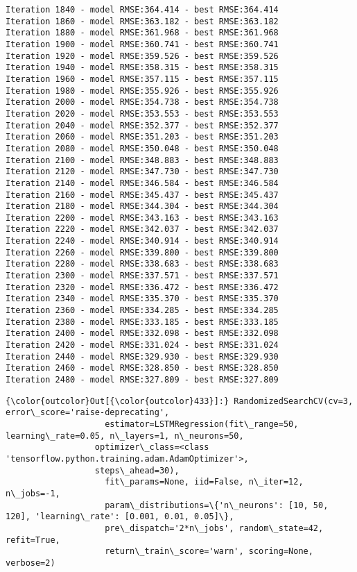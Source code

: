 \documentclass[11pt]{article}
\begin{document}
\begin{Verbatim}[commandchars=\\\{\},fontsize=\small]
Iteration 1840 - model RMSE:364.414 - best RMSE:364.414
Iteration 1860 - model RMSE:363.182 - best RMSE:363.182
Iteration 1880 - model RMSE:361.968 - best RMSE:361.968
Iteration 1900 - model RMSE:360.741 - best RMSE:360.741
Iteration 1920 - model RMSE:359.526 - best RMSE:359.526
Iteration 1940 - model RMSE:358.315 - best RMSE:358.315
Iteration 1960 - model RMSE:357.115 - best RMSE:357.115
Iteration 1980 - model RMSE:355.926 - best RMSE:355.926
Iteration 2000 - model RMSE:354.738 - best RMSE:354.738
Iteration 2020 - model RMSE:353.553 - best RMSE:353.553
Iteration 2040 - model RMSE:352.377 - best RMSE:352.377
Iteration 2060 - model RMSE:351.203 - best RMSE:351.203
Iteration 2080 - model RMSE:350.048 - best RMSE:350.048
Iteration 2100 - model RMSE:348.883 - best RMSE:348.883
Iteration 2120 - model RMSE:347.730 - best RMSE:347.730
Iteration 2140 - model RMSE:346.584 - best RMSE:346.584
Iteration 2160 - model RMSE:345.437 - best RMSE:345.437
Iteration 2180 - model RMSE:344.304 - best RMSE:344.304
Iteration 2200 - model RMSE:343.163 - best RMSE:343.163
Iteration 2220 - model RMSE:342.037 - best RMSE:342.037
Iteration 2240 - model RMSE:340.914 - best RMSE:340.914
Iteration 2260 - model RMSE:339.800 - best RMSE:339.800
Iteration 2280 - model RMSE:338.683 - best RMSE:338.683
Iteration 2300 - model RMSE:337.571 - best RMSE:337.571
Iteration 2320 - model RMSE:336.472 - best RMSE:336.472
Iteration 2340 - model RMSE:335.370 - best RMSE:335.370
Iteration 2360 - model RMSE:334.285 - best RMSE:334.285
Iteration 2380 - model RMSE:333.185 - best RMSE:333.185
Iteration 2400 - model RMSE:332.098 - best RMSE:332.098
Iteration 2420 - model RMSE:331.024 - best RMSE:331.024
Iteration 2440 - model RMSE:329.930 - best RMSE:329.930
Iteration 2460 - model RMSE:328.850 - best RMSE:328.850
Iteration 2480 - model RMSE:327.809 - best RMSE:327.809
    \end{Verbatim}
\begin{Verbatim}[commandchars=\\\{\}]
{\color{outcolor}Out[{\color{outcolor}433}]:} RandomizedSearchCV(cv=3, error\_score='raise-deprecating',
                    estimator=LSTMRegression(fit\_range=50, learning\_rate=0.05, n\_layers=1, n\_neurons=50,
                  optimizer\_class=<class 'tensorflow.python.training.adam.AdamOptimizer'>,
                  steps\_ahead=30),
                    fit\_params=None, iid=False, n\_iter=12, n\_jobs=-1,
                    param\_distributions=\{'n\_neurons': [10, 50, 120], 'learning\_rate': [0.001, 0.01, 0.05]\},
                    pre\_dispatch='2*n\_jobs', random\_state=42, refit=True,
                    return\_train\_score='warn', scoring=None, verbose=2)
\end{Verbatim}
\end{document}
